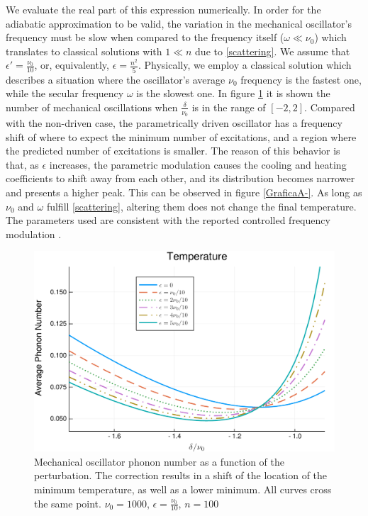 \documentclass[reprint, amsmath,amssymb, aps,pra]{revtex4-1}
\begin{document}
We evaluate the real part of this expression numerically. In order for
the adiabatic approximation to be valid, the variation in the
mechanical oscillator's frequency must be slow when compared to the
frequency itself ($\omega \ll \nu_0$) which translates to classical
solutions with $1 \ll n$ due to \eqref{scattering}. We assume that
$\epsilon' = \frac{\nu_0}{10}$, or, equivalently, $\epsilon = \frac{n^2}{5}$. Physically,
we employ a classical solution which describes a situation where the
oscillator's average $\nu_0$ frequency is the fastest one, while the
secular frequency $\omega$ is the slowest one. In figure \ref{GraficaTemp} it is shown the
number of mechanical oscillations when $\frac{\delta}{\nu_0}$ is in
the range of $[-2,2]$. Compared with the non-driven case, the
parametrically driven oscillator has a frequency shift of where to
expect the minimum number of excitations, and a region where the
predicted number of excitations is smaller. The reason of this
behavior is that, as $\epsilon$ increases, the parametric modulation
causes the cooling and heating coefficients to shift away from each
other, and its distribution becomes narrower and presents a higher
peak. This can be observed in figure \ref{GraficaA-}. As long as
$\nu_0$ and $\omega$ fulfill \eqref{scattering}, altering them does
not change the final temperature. The parameters used are consistent
with the reported controlled frequency modulation
\cite{WoolleyNM}\cite{JockelS}. 



\begin{figure}
\includegraphics[scale=.4]{GraficaTemp.pdf}  
\caption{ Mechanical oscillator phonon number as a function of the
  perturbation. The correction results in a shift of the location of
  the minimum temperature, as well as a lower minimum. All curves
  cross the same point. $\nu_0=1000$, $\epsilon = \frac{\nu_0}{10}$, $n=100$}
\label{GraficaTemp}
\end{figure}
\end{document}
